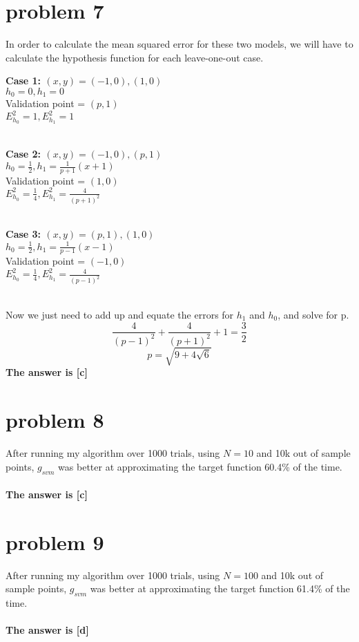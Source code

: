 \documentclass{article}
\begin{document}
\section*{problem 7}
In order to calculate the mean squared error for these two models, we will have to calculate the hypothesis function for each leave-one-out case.\\
\begin{center}
\textbf{Case 1: $(x, y) = (-1, 0), (1, 0)$}\\
$h_0 = 0, h_1 = 0$\\
Validation point = $(p, 1)$\\
$E_{h_0}^2 = 1, E_{h_1}^2 = 1$\\\\
\end{center}
\begin{center}
\textbf{Case 2: $(x, y) = (-1, 0), (p, 1)$}\\
$h_0 = \frac{1}{2}, h_1 = \frac{1}{p+1}(x+1)$\\
Validation point = $(1, 0)$\\
$E_{h_0}^2 = \frac{1}{4}, E_{h_1}^2 = \frac{4}{(p+1)^2}$\\\\
\end{center}
\begin{center}
\textbf{Case 3: $(x, y) = (p, 1), (1, 0)$}\\
$h_0 = \frac{1}{2}, h_1 = \frac{1}{p-1}(x-1)$\\
Validation point = $(-1, 0)$\\
$E_{h_0}^2 = \frac{1}{4}, E_{h_1}^2 = \frac{4}{(p-1)^2}$\\\\
\end{center}
Now we just need to add up and equate the errors for $h_1$ and $h_0$, and solve for p.
\[\frac{4}{(p-1)^2} + \frac{4}{(p+1)^2} + 1 = \frac{3}{2} \]
\[p = \sqrt{9 + 4\sqrt{6}} \]
\textbf{The answer is [c]}

\section*{problem 8} 
After running my algorithm over 1000 trials, using $N=10$ and 10k out of sample points, $g_{svm}$ was better at approximating the target function 60.4\% of the time. \\\\
\textbf{The answer is [c]}

\section*{problem 9}
After running my algorithm over 1000 trials, using $N=100$ and 10k out of sample points, $g_{svm}$ was better at approximating the target function 61.4\% of the time. \\\\
\textbf{The answer is [d]}
\end{document}
